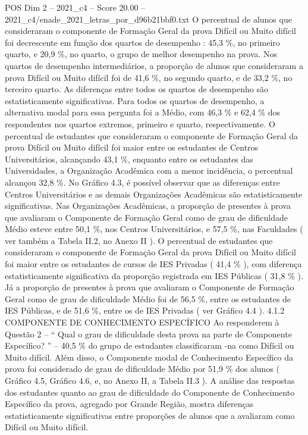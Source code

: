 \begin{textsample}{POS Dim 2 – 2021\_c4 – Score 20.00 – 2021\_c4/enade\_2021\_letras\_por\_d96b21bbf0.txt}
O percentual de alunos que consideraram o componente de Formação Geral da prova Difícil ou Muito difícil foi decrescente em função dos quartos de desempenho : 45,3 \%, no primeiro quarto, e 20,9 \%, no quarto, o grupo de melhor desempenho na prova.
Nos quartos de desempenho intermediários, a proporção de alunos que consideraram a prova Difícil ou Muito difícil foi de 41,6 \%, no segundo quarto, e de 33,2 \%, no terceiro quarto.
As diferenças entre todos os quartos de desempenho são estatisticamente significativas.
Para todos os quartos de desempenho, a alternativa modal para essa pergunta foi a Médio, com 46,3 \% e 62,4 \% dos respondentes nos quartos extremos, primeiro e quarto, respectivamente.
O percentual de estudantes que consideraram o componente de Formação Geral da prova Difícil ou Muito difícil foi maior entre os estudantes de Centros Universitários, alcançando 43,1 \%, enquanto entre os estudantes das Universidades, a Organização Acadêmica com a menor incidência, o percentual alcançou 32,8 \%.
No Gráfico 4.3, é possível observar que as diferenças entre Centros Universitários e as demais Organizações Acadêmicas são estatisticamente significativas.
Nas Organizações Acadêmicas, a proporção de presentes à prova que avaliaram o Componente de Formação Geral como de grau de dificuldade Médio esteve entre 50,1 \%, nos Centros Universitários, e 57,5 \%, nas Faculdades ( ver também a Tabela II.2, no Anexo II ).
O percentual de estudantes que consideraram o componente de Formação Geral da prova Difícil ou Muito difícil foi maior entre os estudantes de cursos de IES Privadas ( 41,4 \% ), com diferença estatisticamente significativa da proporção registrada em IES Públicas ( 31,8 \% ).
Já a proporção de presentes à prova que avaliaram o Componente de Formação Geral como de grau de dificuldade Médio foi de 56,5 \%, entre os estudantes de IES Públicas, e de 51,6 \%, entre os de IES Privadas ( ver Gráfico 4.4 ). 4.1.2 COMPONENTE DE CONHECIMENTO ESPECÍFICO Ao responderem à Questão 2 – “ Qual o grau de dificuldade desta prova na parte de Componente Específico? ” – 40,5 \% do grupo de estudantes classificaram -na como Difícil ou Muito difícil.
Além disso, o Componente modal de Conhecimento Específico da prova foi considerado de grau de dificuldade Médio por 51,9 \% dos alunos ( Gráfico 4.5, Gráfico 4.6, e, no Anexo II, a Tabela II.3 ).
A análise das respostas dos estudantes quanto ao grau de dificuldade do Componente de Conhecimento Específico da prova, agregado por Grande Região, mostra diferenças estatisticamente significativas entre proporções de alunos que a avaliaram como Difícil ou Muito difícil.

\end{textsample}
